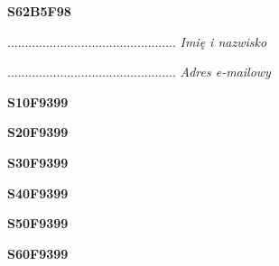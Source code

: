 \begin{turn}{90}\huge \textbf{S62B5F98}\end{turn}

\begin{turn}{90}\begin{minipage}{\linewidth} \vspace{20mm} ................................................  \textit{Imię i nazwisko}\end{minipage}\end{turn}

\begin{turn}{90}\begin{minipage}{\linewidth} \vspace{20mm} ................................................  \textit{Adres e-mailowy}\end{minipage}\end{turn}

\begin{turn}{90}\huge \textbf{S10F9399}\end{turn}

\begin{turn}{90}\huge \textbf{S20F9399}\end{turn}

\begin{turn}{90}\huge \textbf{S30F9399}\end{turn}

\begin{turn}{90}\huge \textbf{S40F9399}\end{turn}

\begin{turn}{90}\huge \textbf{S50F9399}\end{turn}

\begin{turn}{90}\huge \textbf{S60F9399}\end{turn}